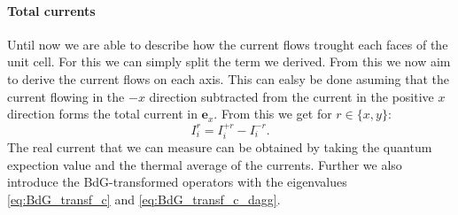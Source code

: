 \documentclass[../main.tex]{subfile}
\begin{document}
\paragraph{Total currents}
Until now we are able to describe how the current flows trought each faces of the unit cell. For this we can simply split the term we derived.
From this we now aim to derive the current flows on each axis.
This can ealsy be done asuming that the current flowing in the $-x$ direction subtracted from the current in the positive $x$ direction forms the total current in $\bm{e}_x$.
From this we get for $r\in\{x,y\}$:
\[
    I_{i}^{r} = I_{i}^{+r} - I_{i}^{-r}.
\]
The real current that we can measure can be obtained by taking the quantum expection value and the thermal average of the currents. Further we also introduce the 
BdG-transformed operators with the eigenvalues \ref{eq:BdG_transf_c} and \ref{eq:BdG_transf_c_dagg}. \\
\end{document}
